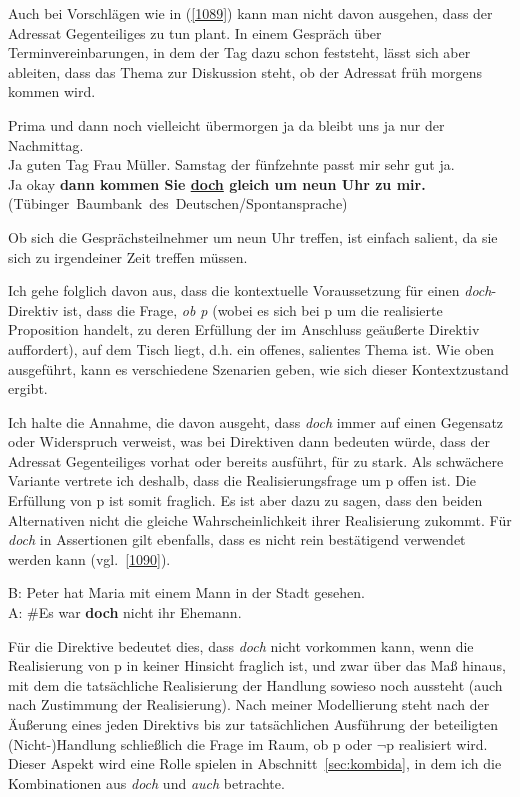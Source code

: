 Auch bei Vorschlägen wie in (\ref{1089}) kann man nicht davon ausgehen, dass der Adressat Gegenteiliges zu tun plant. In einem Gespräch über Terminvereinbarungen, in dem der Tag dazu schon feststeht, lässt sich aber ableiten, dass das Thema zur Diskussion steht, ob der Adressat früh morgens kommen wird. 

\begin{exe}
	\ex\label{1089} 
	Prima und dann noch vielleicht übermorgen ja da bleibt uns ja nur der Nachmittag.\medskip\\
	Ja guten Tag Frau Müller. Samstag der fünfzehnte passt mir sehr gut ja.\medskip\\
	Ja okay \textbf{dann kommen Sie \ul{doch} gleich um neun Uhr zu mir.}
	\newline
	\hbox{}\hfill\hbox{(Tübinger Baumbank des Deutschen/Spontansprache)} 				     
\end{exe}
Ob sich die Gesprächsteilnehmer um neun Uhr treffen, ist einfach salient, da sie sich zu irgendeiner Zeit treffen müssen. 

Ich gehe folglich davon aus, dass die kontextuelle Voraussetzung für einen \textit{doch}-Direktiv ist, dass die Frage, \textit{ob p} (wobei es sich bei p um die realisierte Proposition handelt, zu deren Erfüllung der im Anschluss geäußerte Direktiv auffordert), auf dem Tisch liegt, d.h. ein offenes, salientes Thema ist. Wie oben ausgeführt, kann es verschiedene Szenarien geben, wie sich dieser Kontextzu\-stand ergibt.

Ich halte die Annahme, die davon ausgeht, dass \textit{doch} immer auf einen Gegensatz oder Widerspruch verweist, was bei Direktiven dann bedeuten würde, dass der Adressat Gegenteiliges vorhat oder bereits ausführt, für zu stark. Als schwä\-chere Variante vertrete ich deshalb, dass die Realisierungsfrage um p offen ist. Die Erfüllung von p ist somit fraglich. Es ist aber dazu zu sagen, dass den beiden Alternativen nicht die gleiche Wahrscheinlichkeit ihrer Realisierung zukommt. Für \textit{doch} in Assertionen gilt ebenfalls, dass es nicht rein bestätigend verwendet werden kann (vgl.\ \ref{1090}).

\begin{exe}
	\ex\label{1090} 
	B: Peter hat Maria mit einem Mann in der Stadt gesehen.\\
	A: \#Es war \textbf{doch} nicht ihr Ehemann.				     
\end{exe}
Für die Direktive bedeutet dies, dass \textit{doch} nicht vorkommen kann, wenn die Realisierung von p in keiner Hinsicht fraglich ist, und zwar über das Maß hinaus, mit dem die tatsächliche Realisierung der Handlung sowieso noch aussteht (auch nach Zustimmung der Realisierung). Nach meiner Modellierung steht nach der Äußerung eines jeden Direktivs bis zur tatsächlichen Ausführung der beteiligten (Nicht-)Handlung schließlich die Frage im Raum, ob p oder $\neg$p realisiert wird. Dieser Aspekt wird eine Rolle spielen in Abschnitt~\ref{sec:kombida}, in dem ich die Kombinationen aus \textit{doch} und \textit{auch} betrachte.

